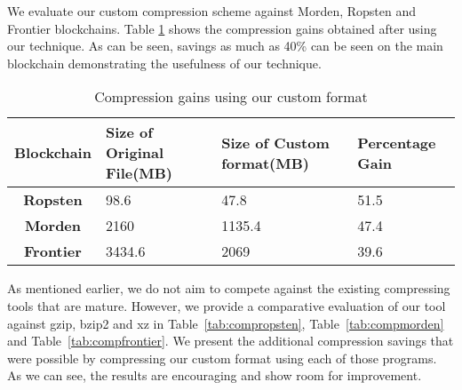 
We evaluate our custom compression scheme against Morden, Ropsten and Frontier blockchains.
Table \ref{tab:origvscustom} shows the compression gains obtained after using our technique.
As can be seen, savings as much as 40\% can be seen on the main blockchain demonstrating the usefulness
of our technique.
\begin{table}[h]
\captionsetup{justification=centering}
\begin{tabular}{ >{\bfseries}c| p{2cm} | p{2cm} | p{1.5cm} }
	Blockchain& {Size of Original File(MB)} & {Size of Custom format(MB)} & Percentage Gain \\
  \hline
  Ropsten & 98.6 & 47.8  &  51.5\\
  Morden & 2160 & 1135.4  & 47.4 \\
  Frontier  & 3434.6  & 2069 & 39.6 \\
\end{tabular}
\caption{Compression gains using our custom format} 
\label{tab:origvscustom}
\end{table}

As mentioned earlier, we do not aim to compete against the existing compressing tools that are mature.
However, we provide a comparative evaluation of our tool against gzip, bzip2 and xz in
Table~\ref{tab:compropsten}, Table~\ref{tab:compmorden} and Table~\ref{tab:compfrontier}. 
We present the additional compression savings that were possible by compressing 
our custom format using each of those programs.
As we can see, the results are encouraging and show room for improvement.

